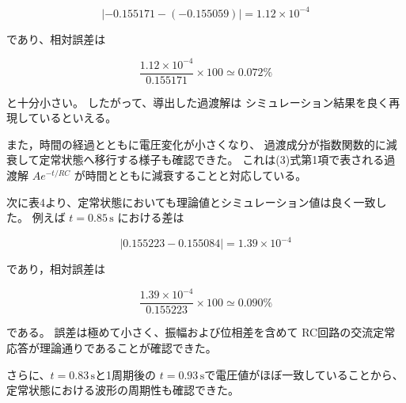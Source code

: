 \documentclass{jarticle}
\begin{document}
\[
|-0.155171-(-0.155059)|
=1.12\times10^{-4}
\]

であり、相対誤差は

\[
\frac{1.12\times10^{-4}}{0.155171}\times100
\simeq 0.072\%
\]

と十分小さい。
したがって、導出した過渡解は
シミュレーション結果を良く再現しているといえる。

また，時間の経過とともに電圧変化が小さくなり、
過渡成分が指数関数的に減衰して定常状態へ移行する様子も確認できた。
これは(3)式第1項で表される過渡解
$Ae^{-t/RC}$
が時間とともに減衰することと対応している。

次に表4より、定常状態においても理論値とシミュレーション値は良く一致した。
例えば $t=0.85\,\mathrm{s}$ における差は

\[
|0.155223-0.155084|
=1.39\times10^{-4}
\]

であり，相対誤差は

\[
\frac{1.39\times10^{-4}}{0.155223}\times100
\simeq0.090\%
\]

である。
誤差は極めて小さく、振幅および位相差を含めて
RC回路の交流定常応答が理論通りであることが確認できた。

さらに、$t=0.83\,\mathrm{s}$と1周期後の
$t=0.93\,\mathrm{s}$で電圧値がほぼ一致していることから、
定常状態における波形の周期性も確認できた。
\end{document}
